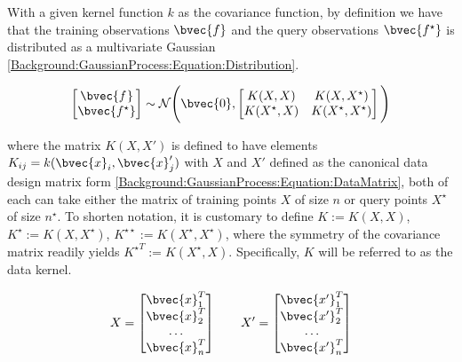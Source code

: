 			With a given kernel function $k$ as the covariance function, by definition we have that the training observations $\bvec{f}$ and the query observations $\bvec{f^{\star}}$ is distributed as a multivariate Gaussian \eqref{Background:GaussianProcess:Equation:Distribution}.
			
			\begin{equation}
				\begin{bmatrix}
					\bvec{f^{ }} \\ \bvec{f^{\star}}
				\end{bmatrix}
				\sim \mathcal{N}\Bigg(\bvec{0}, \begin{bmatrix}
													K(X, X) & K(X, X^{\star}) \\
													K(X^{\star}, X) & K(X^{\star}, X^{\star}) \\
												\end{bmatrix}  \Bigg)
			\label{Background:GaussianProcess:Equation:Distribution}
			\end{equation}
			
			where the matrix $K(X, X')$ is defined to have elements $K_{ij} = k(\bvec{x}_{i}, \bvec{x}'_{j})$ with $X$ and $X'$ defined as the canonical data design matrix form \eqref{Background:GaussianProcess:Equation:DataMatrix}, both of each can take either the matrix of training points $X$ of size $n$ or query points $X^{\star}$ of size $n^{\star}$. To shorten notation, it is customary to define $K := K(X, X)$, $K^{\star} := K(X, X^{\star})$, $K^{\star \star} := K(X^{\star}, X^{\star})$, where the symmetry of the covariance matrix readily yields ${K^{\star}}^{T} := K(X^{\star}, X)$. Specifically, $K$ will be referred to as the data kernel.
			
			\begin{equation}
				X = \begin{bmatrix}
					\bvec{x}_{1}^{T} \\ \bvec{x}_{2}^{T} \\ \dots \\ \bvec{x}_{n}^{T}
				\end{bmatrix} \qquad X' = \begin{bmatrix}
									\bvec{x'}_{1}^{T} \\ \bvec{x'}_{2}^{T} \\ \dots \\ \bvec{x'}_{n}^{T}
								\end{bmatrix}
			\label{Background:GaussianProcess:Equation:DataMatrix}
			\end{equation}	
				
